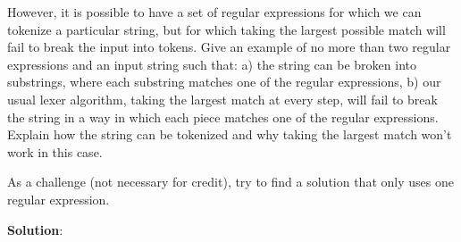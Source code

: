 \documentclass[11pt]{article}
\begin{document}
\begin{enumerate}
However, it is possible to have a set of regular expressions for which we can tokenize a particular string, but for which taking the largest possible match will fail to break the input into tokens. Give an example of no more than two regular expressions and an input string such that: a) the string can be broken into substrings, where each substring matches one of the regular expressions, b) our usual lexer algorithm, taking the largest match at every step, will fail to break the string in a way in which each piece matches one of the regular expressions. Explain how the string can be tokenized and why taking the largest match won't work in this case.

As a challenge (not necessary for credit), try to find a solution that only uses one regular expression.

\textbf{Solution}: %

\end{enumerate}
\end{document}
